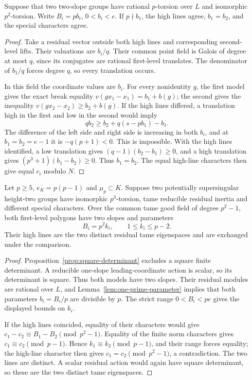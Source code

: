 \begin{lemma}\label{lem:one-prime-parameter}
Suppose that two two-slope groups have rational $p$-torsion over $L$ and isomorphic $p^2$-torsion. Write $B_i=pb_i$, $0<b_i<e$. If $p\nmid b_1$, the high lines agree, $b_1=b_2$, and the special characters agree.
\end{lemma}
\begin{proof}
Take a residual vector outside both high lines and corresponding second-level lifts. Their valuations are $b_i/q$. Their common point field is Galois of degree at most $q$, since its conjugates are rational first-level translates. The denominator of $b_1/q$ forces degree $q$, so every translation occurs.

In this field the coordinate values are $b_i$. For every nonidentity $g$, the first model gives the exact break equality $v(gx_1-x_1)=b_1+b(g)$; the second gives the inequality $v(gx_2-x_2)\ge b_2+b(g)$. If the high lines differed, a translation high in the first and low in the second would imply
\[
                      qb_2\ge b_2+q(s-pb_1)-b_1.
\]
The difference of the left side and right side is increasing in both $b_i$, and at $b_1=b_2=e-1$ it is $-q(p+1)<0$. This is impossible. With the high lines identified, a low translation gives $(q-1)(b_2-b_1)\ge0$, and a high translation gives $(p^3+1)(b_1-b_2)\ge0$. Thus $b_1=b_2$. The equal high-line characters then give equal $c_i$ modulo $N$.
\end{proof}

\begin{corollary}\label{cor:first-wild-tame-pattern}
Let $p\ge5$, $e_K=p(p-1)$ and $\mu_p\subset K$. Suppose two potentially supersingular height-two groups have isomorphic $p^3$-torsion, tame reducible residual inertia and different special characters. Over the common tame good field of degree $p^2-1$, both first-level polygons have two slopes and parameters
\[
                  B_i=p^2k_i,\qquad1\le k_i\le p-2.
\]
Their high lines are the two distinct residual tame eigenspaces and are exchanged under the comparison.
\end{corollary}
\begin{proof}
Proposition~\ref{prop:square-determinant} excludes a square finite determinant. A reducible one-slope leading-coordinate action is scalar, so its determinant is square. Thus both models have two slopes. Their residual modules are rational over $L$, and Lemma~\ref{lem:one-prime-parameter} implies that both parameters $b_i=B_i/p$ are divisible by $p$. The strict range $0<B_i<pe$ gives the displayed bounds on $k_i$.

If the high lines coincided, equality of their characters would give $c_1-c_2\equiv B_1-B_2\pmod{p^2-1}$. Equality of the finite norm characters gives $c_1\equiv c_2\pmod{p-1}$. Hence $k_1\equiv k_2\pmod{p-1}$, and their range forces equality; the high-line character then gives $c_1=c_2\pmod{p^2-1}$, a contradiction. The two lines are distinct. A scalar residual action would again have square determinant, so these are the two distinct tame eigenspaces.
\end{proof}

